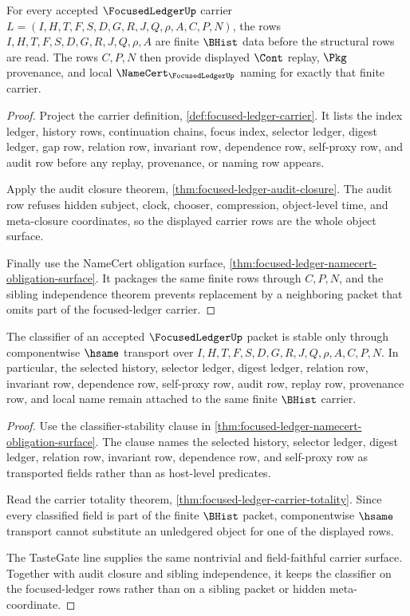 \begin{theorem}
\label{thm:focused-ledger-carrier-totality}
For every accepted $\FocusedLedgerUp$ carrier $L=(I,H,T,F,S,D,G,R,J,Q,\rho,A,C,P,N)$, the rows $I,H,T,F,S,D,G,R,J,Q,\rho,A$ are finite $\BHist$ data before the structural rows are read. The rows $C,P,N$ then provide displayed $\Cont$ replay, $\Pkg$ provenance, and local $\NameCert_{\FocusedLedgerUp}$ naming for exactly that finite carrier.
\end{theorem}
\begin{proof}
Project the carrier definition, \autoref{def:focused-ledger-carrier}. It lists the index ledger, history rows, continuation chains, focus index, selector ledger, digest ledger, gap row, relation row, invariant row, dependence row, self-proxy row, and audit row before any replay, provenance, or naming row appears.

Apply the audit closure theorem, \autoref{thm:focused-ledger-audit-closure}. The audit row refuses hidden subject, clock, chooser, compression, object-level time, and meta-closure coordinates, so the displayed carrier rows are the whole object surface.

Finally use the NameCert obligation surface, \autoref{thm:focused-ledger-namecert-obligation-surface}. It packages the same finite rows through $C,P,N$, and the sibling independence theorem prevents replacement by a neighboring packet that omits part of the focused-ledger carrier.
\end{proof}

\begin{theorem}
\label{thm:focused-ledger-classifier-stability}
The classifier of an accepted $\FocusedLedgerUp$ packet is stable only through componentwise $\hsame$ transport over $I,H,T,F,S,D,G,R,J,Q,\rho,A,C,P,N$. In particular, the selected history, selector ledger, digest ledger, relation row, invariant row, dependence row, self-proxy row, audit row, replay row, provenance row, and local name remain attached to the same finite $\BHist$ carrier.
\end{theorem}
\begin{proof}
Use the classifier-stability clause in \autoref{thm:focused-ledger-namecert-obligation-surface}. The clause names the selected history, selector ledger, digest ledger, relation row, invariant row, dependence row, and self-proxy row as transported fields rather than as host-level predicates.

Read the carrier totality theorem, \autoref{thm:focused-ledger-carrier-totality}. Since every classified field is part of the finite $\BHist$ packet, componentwise $\hsame$ transport cannot substitute an unledgered object for one of the displayed rows.

The TasteGate line supplies the same nontrivial and field-faithful carrier surface. Together with audit closure and sibling independence, it keeps the classifier on the focused-ledger rows rather than on a sibling packet or hidden meta-coordinate.
\end{proof}


